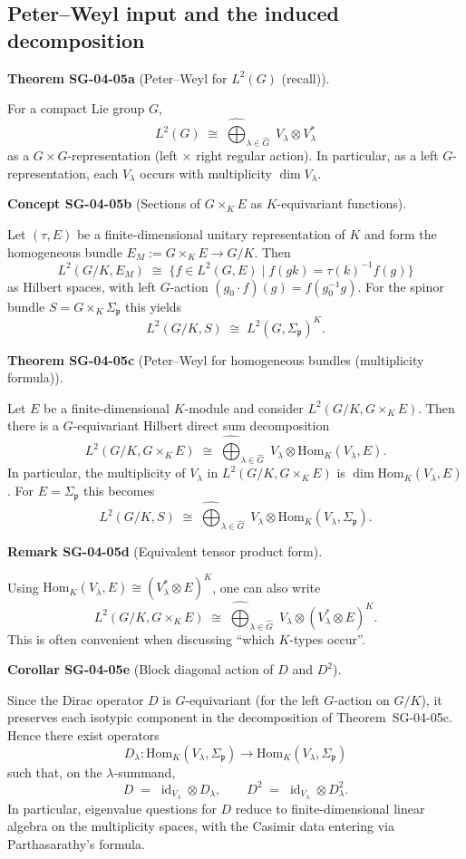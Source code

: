\documentclass[10pt, letterpaper]{article}
\newcommand{\id}{\operatorname{id}}
\newcommand{\Hom}{\mathrm{Hom}}
\newcommand{\CustomHeading}[3]{%
  \par\medskip\noindent%
  \textbf{#1 #2} \textnormal{(#3)}.\enskip%
}
\newenvironment{THEO}[2]{\begin{unitbox}\CustomHeading{Theorem}{#1}{#2}}{\end{unitbox}}
\newenvironment{KORO}[2]{\begin{unitbox}\CustomHeading{Corollar}{#1}{#2}}{\end{unitbox}}
\newenvironment{REM}[2]{\begin{unitbox}\CustomHeading{Remark}{#1}{#2}}{\end{unitbox}}
\newenvironment{CONC}[2]{\begin{unitbox}\CustomHeading{Concept}{#1}{#2}}{\end{unitbox}}
\begin{document}
\subsection{Peter--Weyl input and the induced decomposition}

\begin{THEO}{SG-04-05a}{Peter--Weyl for $L^2(G)$ (recall)}
For a compact Lie group $G$,
\[
L^2(G)\;\cong\;\widehat{\bigoplus}_{\lambda\in\widehat G}\; V_\lambda\otimes V_\lambda^*
\]
as a $G\times G$-representation (left $\times$ right regular action).
In particular, as a left $G$-representation, each $V_\lambda$ occurs with multiplicity $\dim V_\lambda$.
\end{THEO}

\begin{CONC}{SG-04-05b}{Sections of $G\times_K E$ as $K$-equivariant functions}
Let $(\tau,E)$ be a finite-dimensional unitary representation of $K$ and form the homogeneous bundle
$E_M:=G\times_K E\to G/K$.
Then
\[
L^2(G/K,E_M)\;\cong\; \{f\in L^2(G,E)\mid f(gk)=\tau(k)^{-1}f(g)\}
\]
as Hilbert spaces, with left $G$-action $(g_0\cdot f)(g)=f(g_0^{-1}g)$.
For the spinor bundle $S=G\times_K \Sigma_{\mathfrak p}$ this yields
\[
L^2(G/K,S)\;\cong\; L^2(G,\Sigma_{\mathfrak p})^K.
\]
\end{CONC}

\begin{THEO}{SG-04-05c}{Peter--Weyl for homogeneous bundles (multiplicity formula)}
Let $E$ be a finite-dimensional $K$-module and consider $L^2(G/K,G\times_KE)$.
Then there is a $G$-equivariant Hilbert direct sum decomposition
\[
L^2(G/K,G\times_KE)
\;\cong\;
\widehat{\bigoplus}_{\lambda\in\widehat G}\;
V_\lambda \otimes \Hom_K(V_\lambda,E).
\]
In particular, the multiplicity of $V_\lambda$ in $L^2(G/K,G\times_KE)$ is $\dim\Hom_K(V_\lambda,E)$.
For $E=\Sigma_{\mathfrak p}$ this becomes
\[
L^2(G/K,S)\;\cong\;\widehat{\bigoplus}_{\lambda\in\widehat G}\; V_\lambda \otimes \Hom_K(V_\lambda,\Sigma_{\mathfrak p}).
\]
\end{THEO}

\begin{REM}{SG-04-05d}{Equivalent tensor product form}
Using $\Hom_K(V_\lambda,E)\cong (V_\lambda^*\otimes E)^K$, one can also write
\[
L^2(G/K,G\times_KE)
\;\cong\;
\widehat{\bigoplus}_{\lambda\in\widehat G}\;
V_\lambda \otimes (V_\lambda^*\otimes E)^K.
\]
This is often convenient when discussing ``which $K$-types occur''.
\end{REM}

\begin{KORO}{SG-04-05e}{Block diagonal action of $D$ and $D^2$}
Since the Dirac operator $D$ is $G$-equivariant (for the left $G$-action on $G/K$),
it preserves each isotypic component in the decomposition of Theorem~SG-04-05c.
Hence there exist operators
\[
D_\lambda:\Hom_K(V_\lambda,\Sigma_{\mathfrak p})\to \Hom_K(V_\lambda,\Sigma_{\mathfrak p})
\]
such that, on the $\lambda$-summand,
\[
D \;=\; \id_{V_\lambda}\otimes D_\lambda,
\qquad
D^2 \;=\; \id_{V_\lambda}\otimes D_\lambda^2.
\]
In particular, eigenvalue questions for $D$ reduce to finite-dimensional linear algebra on the multiplicity spaces,
with the Casimir data entering via Parthasarathy's formula.
\end{KORO}
\end{document}
